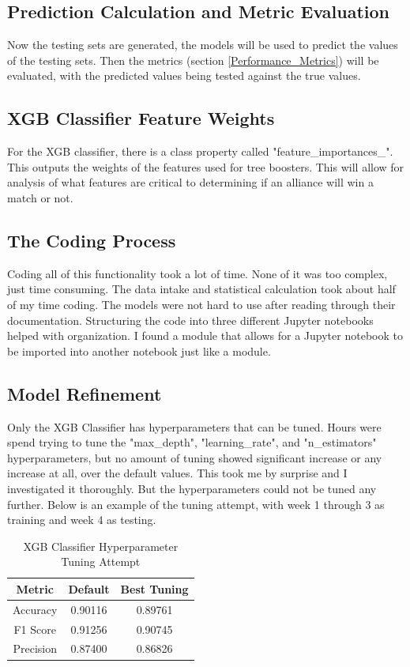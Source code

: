 \documentclass{article}
\begin{document}
\subsection{Prediction Calculation and Metric Evaluation}
\par
Now the testing sets are generated, the models will be used to predict the values of the testing sets. Then the metrics (section \ref{Performance_Metrics}) will be evaluated, with the predicted values being tested against the true values.

\subsection{XGB Classifier Feature Weights}
\par
For the XGB classifier, there is a class property called "feature\_importances\_". This outputs the weights of the features used for tree boosters. This will allow for analysis of what features are critical to determining if an alliance will win a match or not.

\subsection{The Coding Process}
\par
Coding all of this functionality took a lot of time. None of it was too complex, just time consuming. The data intake and statistical calculation took about half of my time coding. The models were not hard to use after reading through their documentation. Structuring the code into three different Jupyter notebooks helped with organization. I found a module that allows for a Jupyter notebook to be imported into another notebook just like a module.

\subsection{Model Refinement}
\par
Only the XGB Classifier has hyperparameters that can be tuned. Hours were spend trying to tune the "max\_depth", "learning\_rate", and "n\_estimators" hyperparameters, but no amount of tuning showed significant increase or any increase at all, over the default values. This took me by surprise and I investigated it thoroughly. But the hyperparameters could not be tuned any further. Below is an example of the tuning attempt, with week 1 through 3 as training and week 4 as testing.

\begin{table}[H]
\caption{XGB Classifier Hyperparameter Tuning Attempt}
\centering
\begin{tabular} { |c|c|c| }
\hline
Metric & Default & Best Tuning \\
\hline
Accuracy & 0.90116 & 0.89761 \\
\hline
F1 Score & 0.91256 & 0.90745 \\
\hline
Precision & 0.87400 & 0.86826 \\
\hline
\end{tabular}
\label{table:tuning}
\end{table}
\end{document}
